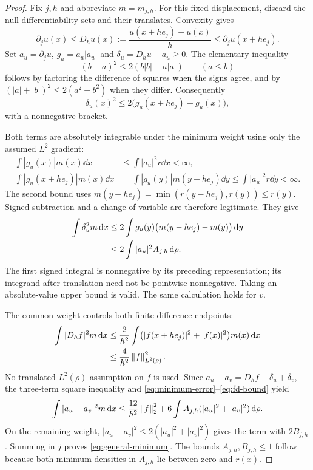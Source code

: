\documentclass[11pt]{article}
\numberwithin{equation}{section}
\theoremstyle{remark}\newtheorem{remark}[theorem]{Remark}
\begin{document}
\begin{proof}
Fix $j,h$ and abbreviate $m=m_{j,h}$. For this fixed displacement, discard the null differentiability sets and their translates. Convexity gives
\[
 \partial_j u(x)\le D_hu(x):=\frac{u(x+he_j)-u(x)}h
          \le\partial_j u(x+he_j).
\]
Set $a_u=\partial_j u$, $g_u=a_u|a_u|$ and $\delta_u=D_hu-a_u\ge0$. The elementary inequality
\begin{equation}\label{eq:signed-square}
 (b-a)^2\le2(b|b|-a|a|)\qquad(a\le b)
\end{equation}
follows by factoring the difference of squares when the signs agree, and by $(|a|+|b|)^2\le2(a^2+b^2)$ when they differ. Consequently
\[
 \delta_u(x)^2\le2\bigl(g_u(x+he_j)-g_u(x)\bigr),
\]
with a nonnegative bracket.

Both terms are absolutely integrable under the minimum weight using only the assumed $L^2$ gradient:
\begin{align*}
 \int|g_u(x)|m(x)\dd x&\le\int|a_u|^2r\dd x<\infty,\\
 \int|g_u(x+he_j)|m(x)\dd x
 &=\int|g_u(y)|m(y-he_j)\dd y\le\int|a_u|^2r\dd y<\infty.
\end{align*}
The second bound uses $m(y-he_j)=\min(r(y-he_j),r(y))\le r(y)$. Signed subtraction and a change of variable are therefore legitimate. They give
\begin{align}
 \int\delta_u^2m\,\mathrm d x
 &\le2\int g_u(y)\bigl(m(y-he_j)-m(y)\bigr)\,\mathrm d y\notag\\
 &\le2\int|a_u|^2 A_{j,h}\,\mathrm d\rho.\label{eq:minimum-error}
\end{align}
The first signed integral is nonnegative by its preceding representation; its integrand after translation need not be pointwise nonnegative. Taking an absolute-value upper bound is valid. The same calculation holds for $v$.

The common weight controls both finite-difference endpoints:
\begin{align}
 \int|D_hf|^2m\,\mathrm d x
 &\le\frac2{h^2}\int\bigl(|f(x+he_j)|^2+|f(x)|^2\bigr)m(x)\,\mathrm d x\notag\\
 &\le\frac4{h^2}\left\lVert f\right\rVert_{L^2(\rho)}^2.\label{eq:fd-bound}
\end{align}
No translated $L^2(\rho)$ assumption on $f$ is used. Since
$a_u-a_v=D_hf-\delta_u+\delta_v$, the three-term square inequality and \eqref{eq:minimum-error}--\eqref{eq:fd-bound} yield
\[
 \int|a_u-a_v|^2m\,\mathrm d x
 \le\frac{12}{h^2}\left\lVert f\right\rVert_2^2
          +6\int A_{j,h}(|a_u|^2+|a_v|^2)\,\mathrm d\rho.
\]
On the remaining weight, $|a_u-a_v|^2\le2(|a_u|^2+|a_v|^2)$ gives the term with $2B_{j,h}$. Summing in $j$ proves \eqref{eq:general-minimum}. The bounds $A_{j,h},B_{j,h}\le1$ follow because both minimum densities in $A_{j,h}$ lie between zero and $r(x)$.
\end{proof}
\end{document}
